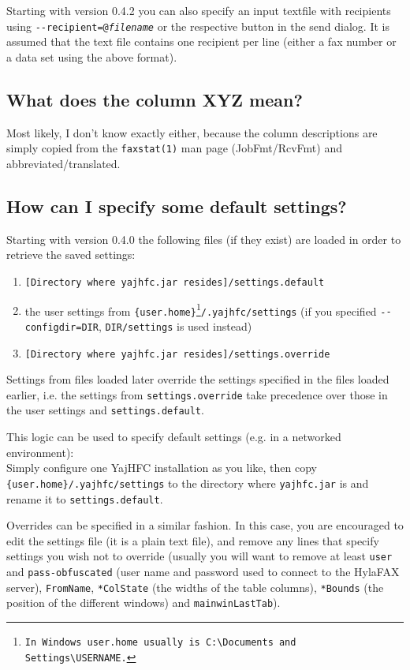 \documentclass[a4paper,10pt]{scrartcl}
\begin{document}
Starting with version 0.4.2 you can also specify an input textfile with recipients using \texttt{-{-}recipient=@\textit{filename}} or the respective button in the send dialog.
It is assumed that the text file contains one recipient per line (either a fax number or a data set using the above format).

\subsection{What does the column XYZ mean?}

Most likely, I don't know exactly either, because the column descriptions
are simply copied from the \verb.faxstat(1). man page (JobFmt/RcvFmt) and 
abbreviated/translated.

\subsection{How can I specify some default settings?}

Starting with version 0.4.0 the following files (if they exist) are loaded in order to retrieve the saved settings:
\begin{enumerate}
 \item \texttt{[Directory where yajhfc.jar resides]/settings.default}
 \item the user settings from \texttt{\{user.home\}\footnote{In Windows \texttt{user.home} usually is \texttt{C:\textbackslash Documents and Settings\textbackslash USERNAME}.}/.yajhfc/settings} (if you specified \texttt{-{-}configdir=DIR}, \texttt{DIR/settings} is used instead)
 \item \texttt{[Directory where yajhfc.jar resides]/settings.override}
\end{enumerate}

Settings from files loaded later override the settings specified in the files loaded earlier, i.e. the settings from \texttt{settings.override} take precedence over those in the user settings and \texttt{settings.default}.
\medskip

This logic can be used to specify default settings (e.g. in a networked environment): \\
Simply configure one YajHFC installation as you like, then copy \texttt{\{user.home\}/.yajhfc/settings} to the directory where \texttt{yajhfc.jar} is and rename it to \texttt{settings.default}.
\medskip

Overrides can be specified in a similar fashion. In this case, you are encouraged to edit the settings file (it is a plain text file), and remove any lines that specify settings you wish not to override (usually you will want to remove at least \texttt{user} and \texttt{pass-obfuscated} (user name and password used to connect to the HylaFAX server), \texttt{FromName}, \texttt{*ColState} (the widths of the table columns), \texttt{*Bounds} (the position of the different windows) and \texttt{mainwinLastTab}).
\end{document}
